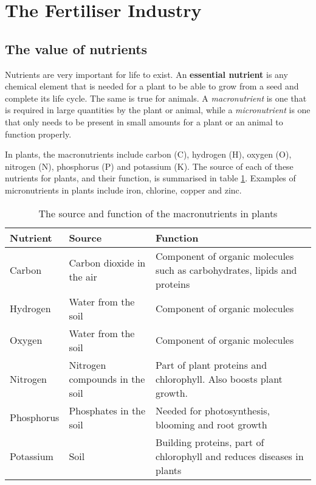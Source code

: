 \section{The Fertiliser Industry}
\label{sec:chemical:fertilisers}

\subsection{The value of nutrients}

Nutrients are very important for life to exist. An \textbf{essential nutrient} is any chemical element that is needed for a plant to be able to grow from a seed and complete its life cycle. The same is true for animals. A \textit{macronutrient} is one that is required in large quantities by the plant or animal, while a \textit{micronutrient} is one that only needs to be present in small amounts for a plant or an animal to function properly.


In plants, the macronutrients include carbon (C), hydrogen (H), oxygen (O), nitrogen (N), phosphorus (P) and potassium (K). The source of each of these nutrients for plants, and their function, is summarised in table \ref{tab:plant macronutrients}. Examples of micronutrients in plants include iron, chlorine, copper and zinc.


\begin{table}[h]
\begin{center}
\caption{The source and function of the macronutrients in plants}
\label{tab:plant macronutrients}
\begin{tabular}{|p{2.8cm}|p{3.2cm}|p{4.2cm}|}\hline
\textbf{Nutrient} & \textbf{Source} & \textbf{Function}\\\hline
Carbon & Carbon dioxide in the air & Component of organic molecules such as carbohydrates, lipids and proteins \\\hline
Hydrogen & Water from the soil & Component of organic molecules \\\hline
Oxygen & Water from the soil & Component of organic molecules \\\hline
Nitrogen & Nitrogen compounds in the soil & Part of plant proteins and chlorophyll. Also boosts plant growth. \\\hline
Phosphorus & Phosphates in the soil & Needed for photosynthesis, blooming and root growth \\\hline
Potassium & Soil & Building proteins, part of chlorophyll and reduces diseases in plants \\\hline
\end{tabular}
\end{center}
\end{table}
 
